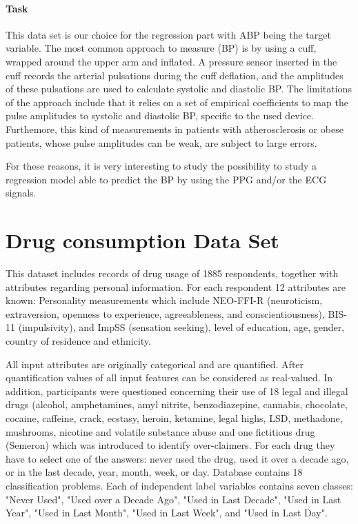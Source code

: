 \documentclass{article}
\begin{document}
\paragraph{Task}
\noindent This data set is our choice for the regression part with ABP being the target variable.
The most common approach to measure (BP) is by using a cuff, wrapped around the upper arm and inflated. A pressure sensor inserted in the cuff records the arterial pulsations during the cuff deflation, and the amplitudes of these pulsations are used to calculate systolic and diastolic BP. The limitations of the approach include that it relies on a set of empirical coefficients to map the pulse amplitudes to systolic and diastolic BP, specific to the used device. Furthemore, this kind of measurements in patients with atherosclerosis or obese patients, whose pulse amplitudes can be weak, are subject to large errors.

For these reasons, it is very interesting to study the possibility to study a regression model able to predict the BP by using the PPG and/or the ECG signals.





\section{Drug consumption Data Set}
This dataset \cite{fehrman2017factor} includes records of drug usage of 1885 respondents, together with attributes regarding personal information. For each respondent 12 attributes are known: Personality measurements which include NEO-FFI-R (neuroticism, extraversion, openness to experience, agreeableness, and conscientiousness), BIS-11 (impulsivity), and ImpSS (sensation seeking), level of education, age, gender, country of residence and ethnicity.

All input attributes are originally categorical and are quantified. After quantification values of all input features can be considered as real-valued. In addition, participants were questioned concerning their use of 18 legal and illegal drugs (alcohol, amphetamines, amyl nitrite, benzodiazepine, cannabis, chocolate, cocaine, caffeine, crack, ecstasy, heroin, ketamine, legal highs, LSD, methadone, mushrooms, nicotine and volatile substance abuse and one fictitious drug (Semeron) which was introduced to identify over-claimers. For each drug they have to select one of the answers: never used the drug, used it over a decade ago, or in the last decade, year, month, week, or day.
Database contains 18 classification problems. Each of independent label variables contains seven classes: "Never Used", "Used over a Decade Ago", "Used in Last Decade", "Used in Last Year", "Used in Last Month", "Used in Last Week", and "Used in Last Day".
\end{document}
